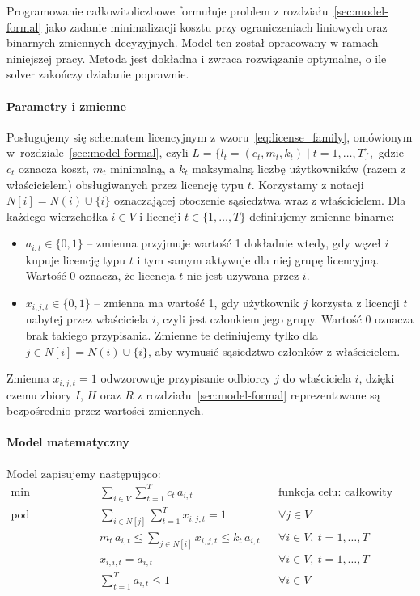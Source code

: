 Programowanie całkowitoliczbowe formułuje problem z rozdziału~\ref{sec:model-formal} jako zadanie 
minimalizacji kosztu przy ograniczeniach liniowych oraz binarnych zmiennych decyzyjnych. 
Model ten został opracowany w ramach niniejszej pracy.
Metoda jest dokładna i zwraca rozwiązanie optymalne, o ile solver zakończy działanie poprawnie.

\paragraph{Parametry i zmienne}
Posługujemy się schematem licencyjnym z wzoru~\eqref{eq:license_family}, omówionym w~rozdziale~\ref{sec:model-formal}, czyli
\(
  L = \{ l_t = (c_t, m_t, k_t) \mid t = 1,\dots,T \},
\)
gdzie \(c_t\) oznacza koszt, \(m_t\) minimalną, a \(k_t\) maksymalną liczbę użytkowników (razem z właścicielem) obsługiwanych przez licencję typu \(t\). Korzystamy z notacji \(N[i]=N(i)\cup\{i\}\) oznaczającej otoczenie sąsiedztwa wraz z właścicielem. Dla każdego wierzchołka \(i\in V\) i licencji \(t\in\{1,\dots,T\}\) definiujemy zmienne binarne:
\begin{itemize}
  \item \(a_{i,t}\in\{0,1\}\) -- zmienna przyjmuje wartość 1 dokładnie wtedy, gdy węzeł \(i\) kupuje licencję typu \(t\) i tym samym aktywuje dla niej grupę licencyjną. Wartość 0 oznacza, że licencja \(t\) nie jest używana przez \(i\).
  \item \(x_{i,j,t}\in\{0,1\}\) -- zmienna ma wartość 1, gdy użytkownik \(j\) korzysta z licencji \(t\) nabytej przez właściciela \(i\), czyli jest członkiem jego grupy. Wartość 0 oznacza brak takiego przypisania. Zmienne te definiujemy tylko dla \(j\in N[i]=N(i)\cup\{i\}\), aby wymusić sąsiedztwo członków z właścicielem.
\end{itemize}
Zmienna \(x_{i,j,t}=1\) odwzorowuje przypisanie odbiorcy \(j\) do właściciela \(i\), dzięki czemu zbiory \(I\), \(H\) oraz \(R\) z rozdziału~\ref{sec:model-formal} reprezentowane są bezpośrednio przez wartości zmiennych.

\paragraph{Model matematyczny}
Model zapisujemy następująco:
\begin{align}
  \min\quad & \sum_{i\in V}\sum_{t=1}^{T} c_t\, a_{i,t}                    
            &  & \text{funkcja celu: całkowity koszt licencji} \\[6pt]
  \text{pod warunkami:}\quad
            & \sum_{i\in N[j]}\sum_{t=1}^{T} x_{i,j,t} = 1                   
            &  & \forall j\in V \label{con:cover} \\[6pt]
            & m_t\, a_{i,t} \le \sum_{j\in N[i]} x_{i,j,t} \le k_t\, a_{i,t} 
            &  & \forall i\in V,\ t=1,\dots,T \label{con:capacity} \\[6pt]
            & x_{i,i,t} = a_{i,t}                                              
            &  & \forall i\in V,\ t=1,\dots,T \label{con:owner} \\[6pt]
            & \sum_{t=1}^{T} a_{i,t} \le 1                                     
            &  & \forall i\in V \label{con:one}
\end{align}

